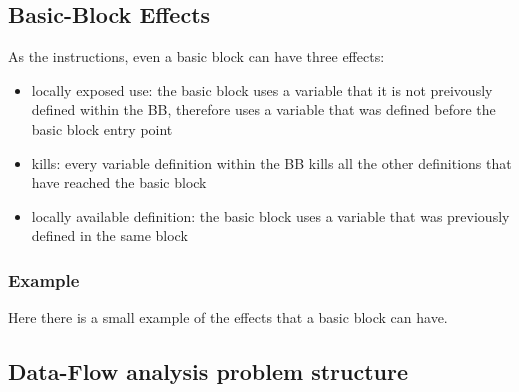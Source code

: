 \documentclass{article}
\begin{document}
\subsection{Basic-Block Effects}

As the instructions, even a basic block can have three effects:

\begin{itemize}
    \item locally exposed use: the basic block uses a variable that it is not preivously defined within the BB, therefore uses a variable that was defined before the basic block entry point
    \item kills: every variable definition within the BB kills all the other definitions that have reached the basic block
    \item locally available definition: the basic block uses a variable that was previously defined in the same block
\end{itemize}

\subsubsection{Example}

Here there is a small example of the effects that a basic block can have.


\subsection{Data-Flow analysis problem structure}
\end{document}

